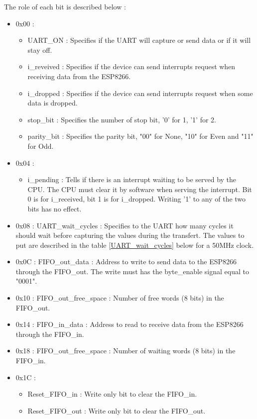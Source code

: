 \documentclass[11pt]{article}
\begin{document}
The role of each bit is described below :
\begin{itemize}
    \item 0x00 :
    \begin{itemize}
        \item UART\_ON : Specifies if the UART will capture or send data or if it will stay off.
        \item i\_reveived : Specifies if the device can send interrupts request when receiving data from the ESP8266.
        \item i\_dropped : Specifies if the device can send interrupts request when some data is dropped.
        \item stop\_bit : Specifies the number of stop bit, '0' for 1, '1' for 2.
        \item parity\_bit : Specifies the parity bit, "00" for None, "10" for Even and "11" for Odd.
    \end{itemize}
    \item 0x04 : 
    \begin{itemize}
        \item i\_pending : Tells if there is an interrupt waiting to be served by the CPU. The CPU must clear it by software when serving the interrupt. Bit 0 is for i\_received, bit 1 is for i\_dropped. Writing '1' to any of the two bits has no effect.
    \end{itemize}
    \item 0x08 : UART\_wait\_cycles : Specifies to the UART how many cycles it should wait before capturing the values during the transfert. The values to put are described in the table \ref{UART_wait_cycles} below for a 50MHz clock. 
    \item 0x0C : FIFO\_out\_data : Address to write to send data to the ESP8266 through the FIFO\_out. The write must has the byte\_enable signal equal to "0001".
    \item 0x10 : FIFO\_out\_free\_space : Number of free words (8 bits) in the FIFO\_out. 
    \item 0x14 : FIFO\_in\_data : Address to read to receive data from the ESP8266 through the FIFO\_in. 
    \item 0x18 : FIFO\_out\_free\_space : Number of waiting words (8 bits) in the FIFO\_in. 
    \item 0x1C :
    \begin{itemize}
        \item Reset\_FIFO\_in : Write only bit to clear the FIFO\_in.
        \item Reset\_FIFO\_out : Write only bit to clear the FIFO\_out.
    \end{itemize}
\end{itemize}
\end{document}
